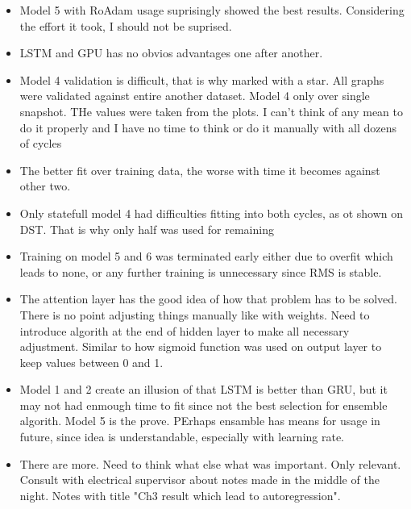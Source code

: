 \begin{itemize}
    \item Model 5 with RoAdam usage suprisingly showed the best results. Considering the effort it took, I should not be suprised.
    \item LSTM and GPU has no obvios advantages one after another.
    \item Model 4 validation is difficult, that is why marked with a star. All graphs were validated against entire another dataset. Model 4 only over single snapshot. THe values were taken from the plots. I can't think of any mean to do it properly and I have no time to think or do it manually with all dozens of cycles
    \item The better fit over training data, the worse with time it becomes against other two.
    \item Only statefull model 4 had difficulties fitting into both cycles, as ot shown on DST. That is why only half was used for remaining
    \item Training on model 5 and 6 was terminated early either due to overfit which leads to none, or any further training is unnecessary since RMS is stable.
    \item The attention layer has the good idea of how that problem has to be solved. There is no point adjusting things manually like with weights. Need to introduce algorith at the end of hidden layer to make all necessary adjustment. Similar to how sigmoid function was used on output layer to keep values between 0 and 1.
    \item Model 1 and 2 create an illusion of that LSTM is better than GRU, but it may not had enmough time to fit since not the best selection for ensemble algorith. Model 5 is the prove. PErhaps ensamble has means for usage in future, since idea is understandable, especially with learning rate.
    \item There are more. Need to think what else what was important. Only relevant. Consult with electrical supervisor about notes made in the middle of the night. Notes with title "Ch3 result which lead to autoregression".
\end{itemize}
